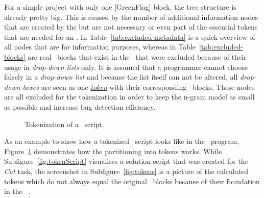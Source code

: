For a simple \scratch{} project with only one [GreenFlag] block, the tree structure is already pretty big. This is caused by the number of additional information nodes that are created by the \litterbox{} \AST{} but are not necessary or even part of the essential tokens that are needed for an \ngram{}. In Table~\ref{tab:excluded-metadata} is a quick overview of all  nodes that are for information purposes, whereas in Table~\ref{tab:excluded-blocks} are real \scratch\ blocks that exist in the \AST\ that were excluded because of their usage in \textit{drop-down lists} only. It is assumed that a programmer cannot choose falsely in a \textit{drop-down list} and because the list itself can not be altered, all \textit{drop-down boxes} are seen as one  \hyperref[def:token]{\textit{token}} with their corresponding \scratch\ blocks. These nodes are all excluded for the tokenization in order to keep the n-gram model as small as possible and increase bug detection efficiency.  

\begin{figure}[hbtp]%
    \centering
    \qquad
    \caption[Tokenization of a \scratch\ script]{\label{fig:tokenization}Tokenization of a \scratch\ script.}%
\end{figure}

As an example to show how a tokenized \scratch\ script looks like in the \tokenizer\ program, Figure~\ref{fig:tokenization} demonstrates how the partitioning into tokens works. While Subfigure~\ref{fig:tokenScript} visualises a solution script that was created for the \textit{Cat} task, the screenshot in Subfigure~\ref{fig:tokens} is a picture of the calculated tokens which do not always equal the original \scratch\ blocks because of their foundation in the \litterbox\ \AST{}. 

